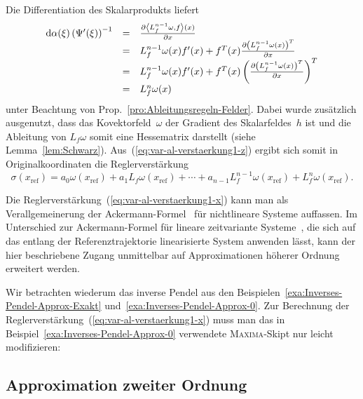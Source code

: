 Die Differentiation des Skalarprodukts liefert 
\[
\begin{array}{ccl}
{\mathrm{d}}\alpha(\xi)\left(\Psi^{\prime}(\xi)\right)^{-1} & = & \frac{\partial\left\langle L_{f}^{n-1}\omega,f\right\rangle (x)}{\partial x}\\
 & = & L_{f}^{n-1}\omega(x)f^{\prime}(x)+f^{T}(x)\frac{\partial\left(L_{f}^{n-1}\omega(x)\right)^{T}}{\partial x}\\
 & = & L_{f}^{n-1}\omega(x)f^{\prime}(x)+f^{T}(x)\left(\frac{\partial\left(L_{f}^{n-1}\omega(x)\right)^{T}}{\partial x}\right)^{T}\\
 & = & L_{f}^{n}\omega(x)
\end{array}
\]
unter Beachtung von Prop.~\ref{pro:Ableitungsregeln-Felder}. Dabei
wurde zusätzlich ausgenutzt, dass das Kovektorfeld~$\omega$ der
Gradient des Skalarfeldes~$h$ ist und die Ableitung von $L_{f}\omega$
somit eine Hessematrix darstellt (siehe Lemma~\ref{lem:Schwarz}).
Aus~(\ref{eq:var-al-verstaerkung1-z}) ergibt sich somit in Originalkoordinaten
die Reglerverstärkung 
\begin{equation}
\sigma(x_{\text{ref}})=a_{0}\omega(x_{\text{ref}})+a_{1}L_{f}\omega(x_{\text{ref}})+\cdots+a_{n-1}L_{f}^{n-1}\omega(x_{\text{ref}})+L_{f}^{n}\omega(x_{\text{ref}}).\label{eq:var-al-verstaerkung1-x}
\end{equation}

Die Reglerverstärkung~(\ref{eq:var-al-verstaerkung1-x}) kann man
als Verallgemeinerung der Ackermann-Formel~\cite{acker77,ackermann77}
für nichtlineare Systeme auffassen. Im Unterschied zur Ackermann-Formel
für lineare zeitvariante Systeme~\cite{freund71,foellinger78}, die
sich auf das entlang der Referenztrajektorie linearisierte System
anwenden lässt, kann der hier beschriebene Zugang unmittelbar auf
Approximationen höherer Ordnung erweitert werden.
\begin{example}
\label{exa:Inverses-Pendel-Approx-1}Wir betrachten wiederum das inverse
Pendel aus den Beispielen~\ref{exa:Inverses-Pendel-Approx-Exakt}
und~\ref{exa:Inverses-Pendel-Approx-0}. Zur Berechnung der Reglerverstärkung~(\ref{eq:var-al-verstaerkung1-x})
muss man das in Beispiel~\ref{exa:Inverses-Pendel-Approx-0} verwendete
\textsc{Maxima}-Skipt nur leicht modifizieren:

\begin{maxima}\end{maxima}
\end{example}

\subsection{Approximation zweiter Ordnung\label{subsec:Approx-zweiter-Ordnung}}

